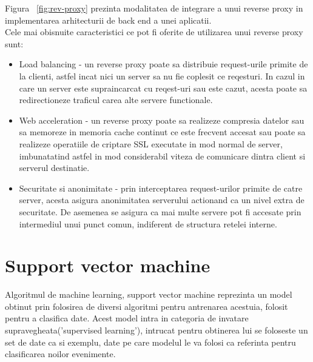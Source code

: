 Figura ~\ref{fig:rev-proxy} prezinta modalitatea de integrare a unui reverse proxy in implementarea arhitecturii de back end a unei aplicatii. \\

Cele mai obisnuite caracteristici ce pot fi oferite de utilizarea unui reverse proxy sunt:
\begin{itemize}
	\item Load balancing - un reverse proxy poate sa distribuie request-urile primite de la clienti, astfel incat nici un server sa nu fie coplesit ce reqesturi. In cazul in care un server este supraincarcat cu reqest-uri sau este cazut, acesta poate sa redirectioneze traficul carea alte servere functionale.
	\item Web acceleration - un reverse proxy poate sa realizeze compresia datelor sau sa memoreze in memoria cache continut ce este frecvent accesat sau poate sa realizeze operatiile de criptare SSL executate in mod normal de server, imbunatatind astfel in mod considerabil viteza de comunicare dintra client si serverul destinatie.
	\item Securitate si anonimitate - prin interceptarea request-urilor primite de catre server, acesta asigura anonimitatea serverului actionand ca un nivel extra de securitate. De asemenea se asigura ca mai multe servere pot fi accesate prin intermediul unui punct comun, indiferent de structura retelei interne.
\end{itemize}



\section{Support vector machine}

Algoritmul de machine learning, support vector machine reprezinta un model obtinut prin folosirea de diversi algoritmi pentru antrenarea acestuia, folosit pentru a clasifica date. Acest model intra in categoria de invatare supravegheata('supervised learning'), intrucat pentru obtinerea lui se foloseste un set de date ca si exemplu, date pe care modelul le va folosi ca referinta pentru clasificarea noilor evenimente.


